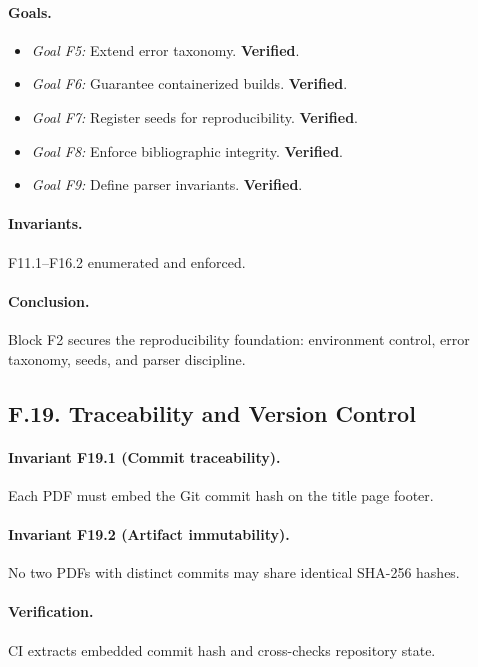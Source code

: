 \paragraph{Goals.}
\begin{itemize}
  \item \emph{Goal F5:} Extend error taxonomy. \textbf{Verified}.
  \item \emph{Goal F6:} Guarantee containerized builds. \textbf{Verified}.
  \item \emph{Goal F7:} Register seeds for reproducibility. \textbf{Verified}.
  \item \emph{Goal F8:} Enforce bibliographic integrity. \textbf{Verified}.
  \item \emph{Goal F9:} Define parser invariants. \textbf{Verified}.
\end{itemize}

\paragraph{Invariants.}
F11.1–F16.2 enumerated and enforced.

\paragraph{Conclusion.}
Block F2 secures the reproducibility foundation: environment control,
error taxonomy, seeds, and parser discipline.

\subsection*{F.19. Traceability and Version Control}

\paragraph{Invariant F19.1 (Commit traceability).}
Each PDF must embed the Git commit hash on the title page footer.

\paragraph{Invariant F19.2 (Artifact immutability).}
No two PDFs with distinct commits may share identical SHA-256 hashes.

\paragraph{Verification.}
CI extracts embedded commit hash and cross-checks repository state.

